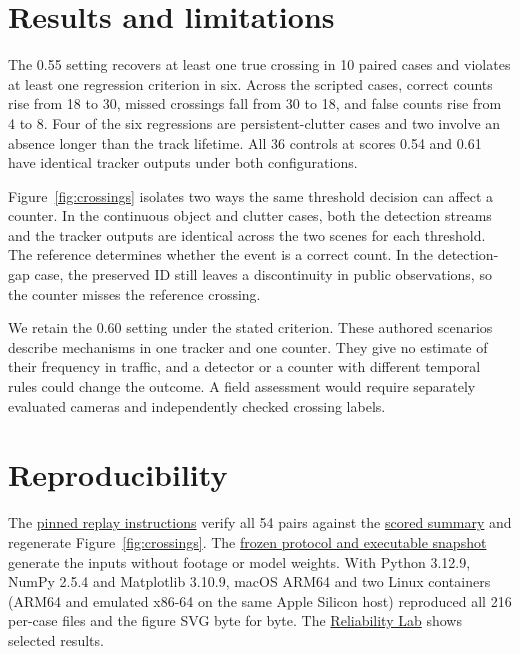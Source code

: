 \documentclass[11pt]{article}
\begin{document}
\newpage
\section{Results and limitations}
The 0.55 setting recovers at least one true crossing in 10 paired cases and violates at least one regression criterion in six. Across the scripted cases, correct counts rise from 18 to 30, missed crossings fall from 30 to 18, and false counts rise from 4 to 8. Four of the six regressions are persistent-clutter cases and two involve an absence longer than the track lifetime. All 36 controls at scores 0.54 and 0.61 have identical tracker outputs under both configurations.

Figure~\ref{fig:crossings} isolates two ways the same threshold decision can affect a counter. In the continuous object and clutter cases, both the detection streams and the tracker outputs are identical across the two scenes for each threshold. The reference determines whether the event is a correct count. In the detection-gap case, the preserved ID still leaves a discontinuity in public observations, so the counter misses the reference crossing.

We retain the 0.60 setting under the stated criterion. These authored scenarios describe mechanisms in one tracker and one counter. They give no estimate of their frequency in traffic, and a detector or a counter with different temporal rules could change the outcome. A field assessment would require separately evaluated cameras and independently checked crossing labels.

\section{Reproducibility}
The \href{https://github.com/hulagerushikesh/visiontrack/blob/b4ccff0dc415e9755c1dc2448d3b3defc5a87481/docs/INITIATION_THRESHOLD_FINDINGS.md\#reproduce-the-study-and-figure}{pinned replay instructions} verify all 54 pairs against the \href{https://github.com/hulagerushikesh/visiontrack/blob/898593aed4111fff38c872807d7299581d6f8de2/experiments/initiation_threshold_v1_results.json}{scored summary} and regenerate Figure~\ref{fig:crossings}. The \href{https://github.com/hulagerushikesh/visiontrack/blob/4b44af0abb0c7448f6baf796e5cfa1062d52f6a6/docs/INITIATION_THRESHOLD_PROTOCOL.md}{frozen protocol and executable snapshot} generate the inputs without footage or model weights. With Python 3.12.9, NumPy 2.5.4 and Matplotlib 3.10.9, macOS ARM64 and two Linux containers (ARM64 and emulated x86-64 on the same Apple Silicon host) reproduced all 216 per-case files and the figure SVG byte for byte. The \href{https://visiontrack.hulage.in/lab/crossings\#controlled-threshold}{Reliability Lab} shows selected results.
\end{document}
